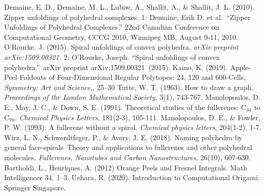 \documentclass[]{interact}
\theoremstyle{plain}%
\theoremstyle{definition}
\theoremstyle{remark}
\begin{document}
\begin{thebibliography}{}
Demaine, E. D., Demaine, M. L., Lubiw, A., Shallit, A., \& Shallit, J. L. (2010). Zipper unfoldings of polyhedral complexes.
1: Demaine, Erik D. et al.~``Zipper Unfoldings of Polyhedral
Complexes.'' 22nd Canadian Conference on Computational Geometry, CCCG
2010, Winnipeg MB, August 9-11,
2010.
O'Rourke, J. (2015). Spiral unfoldings of convex polyhedra. \textit{arXiv preprint arXiv:1509.00321.}
2: O'Rourke, Joseph. ``Spiral unfoldings of convex polyhedra.''~arXiv
preprint arXiv:1509.00321~(2015).
Kaino, K. (2019). Apple-Peel Foldouts of Four-Dimensional Regular Polytopes: 24, 120 and 600-Cells, \textit{Symmetry: Art and Science.}, 25--30
Tutte, W. T. (1963). How to draw a graph. \textit{Proceedings of the London Mathematical Society}, 3(1), 743-767.
Manolopoulos, D. E., May, J. C., \& Down, S. E. (1991). Theoretical studies of the fullerenes: $\mathrm{C}_{34}$ to $\mathrm{C}_{70}$. \textit{Chemical Physics Letters}, 181(2-3), 105-111.
Manolopoulos, D. E., \& Fowler, P. W. (1993). A fullerene without a spiral. \textit{Chemical physics letters}, 204(1-2), 1-7.
Wirz, L. N., Schwerdtfeger, P., \& Avery, J. E. (2018). Naming polyhedra by general face-spirals--Theory and applications to fullerenes and other polyhedral molecules. \textit{Fullerenes, Nanotubes and Carbon Nanostructures}, 26(10), 607-630.
 Bartholdi, L., Henriques, A. (2012) Orange Peels and Fresnel Integrals. Math Intelligencer 34, 1--3. 
 Uehara, R. (2020). Introduction to Computational Origami. Springer Singapore.
\end{thebibliography}
\end{document}
